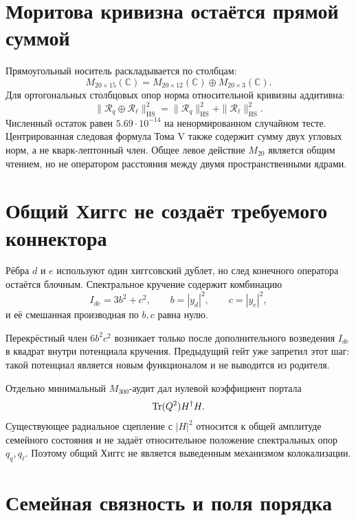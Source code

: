 \section{Моритова кривизна остаётся прямой суммой}

Прямоугольный носитель раскладывается по столбцам:
\begin{equation}
 M_{20\times15}(\mathbb C)
 =M_{20\times12}(\mathbb C)\oplus M_{20\times3}(\mathbb C).
\end{equation}
Для ортогональных столбцовых опор норма относительной кривизны
аддитивна:
\begin{equation}
 \|\mathcal R_q\oplus\mathcal R_\ell\|_{\mathrm{HS}}^2
 =\|\mathcal R_q\|_{\mathrm{HS}}^2
 +\|\mathcal R_\ell\|_{\mathrm{HS}}^2.
\end{equation}
Численный остаток равен $5.69\cdot10^{-14}$ на ненормированном случайном
тесте. Центрированная следовая формула Тома V также содержит сумму двух
угловых норм, а не кварк-лептонный член. Общее левое действие $M_{20}$
является общим чтением, но не оператором расстояния между двумя
пространственными ядрами.

\section{Общий Хиггс не создаёт требуемого коннектора}

Рёбра $d$ и $e$ используют один хиггсовский дублет, но след конечного
оператора остаётся блочным. Спектральное кручение содержит комбинацию
\begin{equation}
 I_{de}=3b^2+c^2,
 \qquad
 b=|y_d|^2,
 \qquad
 c=|y_e|^2,
\end{equation}
и её смешанная производная по $b,c$ равна нулю.

Перекрёстный член $6b^2c^2$ возникает только после дополнительного
возведения $I_{de}$ в квадрат внутри потенциала кручения. Предыдущий гейт
уже запретил этот шаг: такой потенциал является новым функционалом и не
выводится из родителя.

Отдельно минимальный $M_{300}$-аудит дал нулевой коэффициент портала
\begin{equation}
 \operatorname{Tr}(Q^2)H^\dagger H.
\end{equation}
Существующее радиальное сцепление с $|H|^2$ относится к общей амплитуде
семейного состояния и не задаёт относительное положение спектральных
опор $q_q,q_\ell$. Поэтому общий Хиггс не является выведенным механизмом
колокализации.

\section{Семейная связность и поля порядка}

